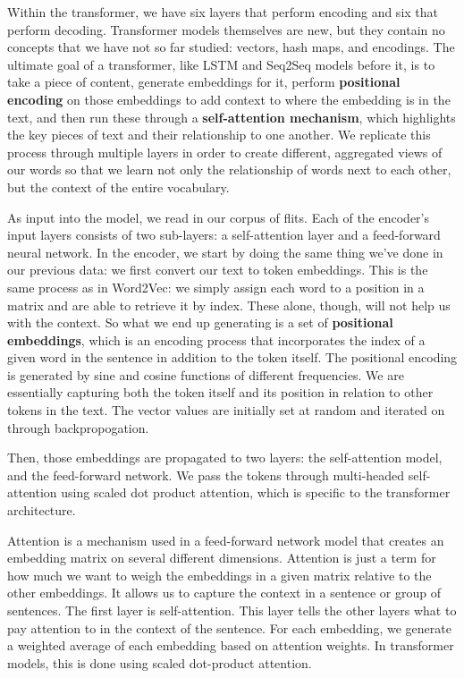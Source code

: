 \documentclass[11pt, table]{diazessay} %
\begin{document}
\begin{sloppypar}
Within the transformer, we have six layers that perform encoding and six that perform decoding.  Transformer models themselves are new, but they contain no concepts that we have not so far studied: vectors, hash maps, and encodings.  The ultimate goal of a transformer, like LSTM and Seq2Seq models before it, is to take a piece of content, generate embeddings for it, perform \textbf{positional encoding} on those embeddings to add context to where the embedding is in the text, and then run these through a \textbf{self-attention mechanism}, which highlights the key pieces of text and their relationship to one another. We replicate this process through multiple layers in order to create different, aggregated views of our words so that we learn not only the relationship of words next to each other, but the context of the entire vocabulary. 

As input into the model, we read in our corpus of flits. Each of the encoder's input layers consists of two sub-layers: a self-attention layer and a feed-forward neural network. In the encoder, we start by doing the same thing we've done in our previous data: we first convert our text to token embeddings. This is the same process as in Word2Vec: we simply assign each word to a position in a matrix and are able to retrieve it by index. These alone, though, will not help us with the context. So what we end up generating is a set of \textbf{positional embeddings}, which is an encoding process that incorporates the index of a given word in the sentence in addition to the token itself. The positional encoding is generated by sine and cosine functions of different frequencies. We are essentially capturing both the token itself and its position in relation to other tokens in the text. The vector values are initially set at random and iterated on through backpropogation. 

Then, those embeddings are propagated to two layers: the self-attention model, and the feed-forward network. We pass the tokens through multi-headed self-attention using scaled dot product attention, which is specific to the transformer architecture. 

Attention is a mechanism used in a feed-forward network model that creates an embedding matrix on several different dimensions\citep{amatriain2023transformer}. Attention is just a term for how much we want to weigh the embeddings in a given matrix relative to the other embeddings. It allows us to capture the context in a sentence or group of sentences. The first layer is self-attention. This layer tells the other layers what to pay attention to in the context of the sentence.  For each embedding, we generate a weighted average of each embedding based on attention weights. In transformer models, this is done using scaled dot-product attention. 


\end{sloppypar}
\end{document}
